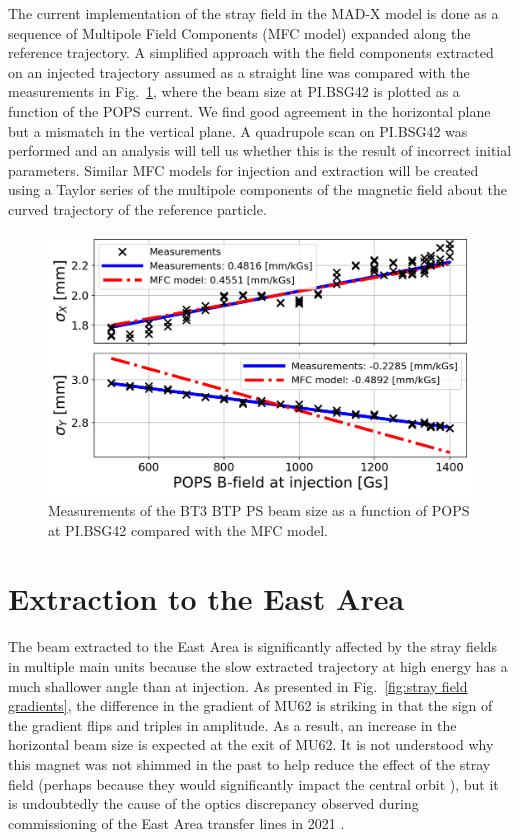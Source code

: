 \documentclass[a4paper,
               biblatex,     %
               keeplastbox,   %
               ]{jacow}
\begin{document}
The current implementation of the stray field in the \mbox{MAD-X} model is done as a sequence of Multipole Field Components (MFC model) expanded along the reference trajectory. A simplified approach with the field components extracted on an injected trajectory assumed as a straight line was compared with the measurements in Fig.~\ref{fig:injection_btp_beam_size}, where the beam size at PI.BSG42 is plotted as a function of the POPS current. We find good agreement in the horizontal plane but a mismatch in the vertical plane. A quadrupole scan on PI.BSG42 was performed and an analysis will tell us whether this is the result of incorrect initial parameters. Similar MFC models for injection and extraction will be created using  a Taylor series of the multipole components of the magnetic field about the curved trajectory of the reference particle.

\begin{figure}[!htb]
   \centering
   \includegraphics*[width=1.0\columnwidth]{Beam_size_vs_POPS.png}
   \caption{Measurements of the BT3 BTP PS beam size as a function of POPS at PI.BSG42 compared with the MFC model.}
   \label{fig:injection_btp_beam_size}
\end{figure}

\section{Extraction to the East Area}
The beam extracted to the East Area is significantly affected by the stray fields in multiple main units because the slow extracted trajectory at high energy has a much shallower angle than at injection. As presented in Fig.~\ref{fig:stray field gradients}, the difference in the gradient of MU62 is striking in that the sign of the gradient flips and triples in amplitude. As a result, an increase in the horizontal beam size is expected at the exit of MU62. It is not understood why this magnet was not shimmed in the past to help reduce the effect of the stray field (perhaps because they would significantly impact the central orbit \cite{Zickler:private}), but it is undoubtedly the cause of the optics discrepancy observed during commissioning of the East Area transfer lines in 2021 \cite{huschauer:ipac22-mopost006}.
\end{document}
